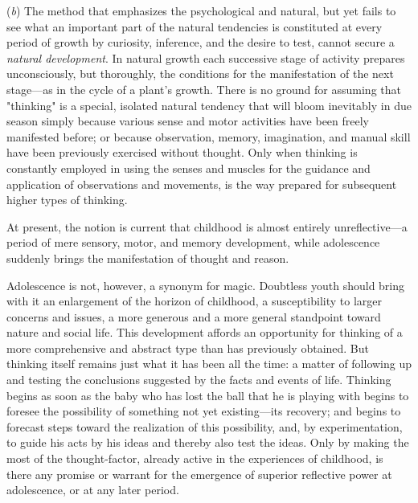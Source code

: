 \documentclass[letterpaper]{book}
\begin{document}

(\emph{b}) The method that emphasizes the psychological and natural, but
yet fails to see what an important part of the natural tendencies is
constituted at every period of growth by curiosity, inference, and the
desire to test, cannot secure a \emph{natural development}. In natural
growth each successive stage of activity prepares unconsciously, but
thoroughly, the conditions for the manifestation of the next stage---as
in the cycle of a plant's growth. There is no ground for assuming that
"thinking" is a special, isolated natural tendency that will bloom
inevitably in due season simply because various sense and motor
activities have been freely manifested before; or because observation,
memory, imagination, and manual skill have been previously exercised
without thought. Only when thinking is constantly employed in using the
senses and muscles for the guidance and application of observations and
movements, is the way prepared for subsequent higher types of thinking.


At present, the notion is current that childhood is almost entirely
unreflective---a period of mere sensory, motor, and memory development,
while adolescence suddenly brings the manifestation of thought and
reason.

Adolescence is not, however, a synonym for magic. Doubtless youth should
bring with it an enlargement of the horizon of childhood, a
susceptibility to larger concerns and issues, a more generous and a more
general standpoint toward nature and social life. This development
affords an opportunity for thinking of a more
comprehensive
and abstract type than has previously obtained. But thinking itself
remains just what it has been all the time: a matter of following up and
testing the conclusions suggested by the facts and events of life.
Thinking begins as soon as the baby who has lost the ball that he is
playing with begins to foresee the possibility of something not yet
existing---its recovery; and begins to forecast steps toward the
realization of this possibility, and, by experimentation, to guide his
acts by his ideas and thereby also test the ideas. Only by making the
most of the thought-factor, already active in the experiences of
childhood, is there any promise or warrant for the emergence of superior
reflective power at adolescence, or at any later period.
\end{document}
